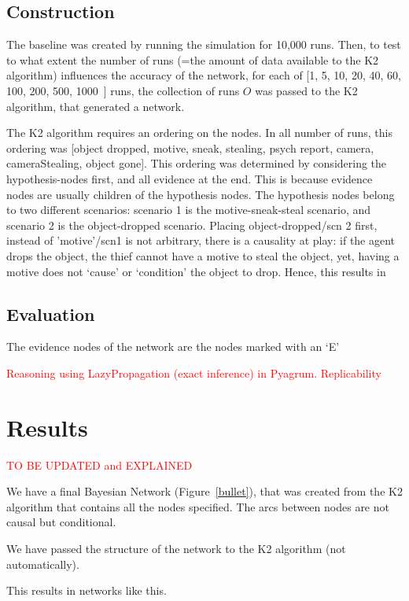 \documentclass[12pt]{article}
\begin{document}
\subsection{Construction}
The baseline was created by running the simulation for 10,000 runs. Then, to test to what extent the number of runs (=the amount of data available to the K2 algorithm) influences the accuracy of the network, for each of [1, 5, 10, 20, 40, 60, 100, 200, 500, 1000~] runs, the collection of runs $O$ was passed to the K2 algorithm, that generated a network.

The K2 algorithm requires an ordering on the nodes. In all number of runs, this ordering was 
[object dropped, motive, sneak, stealing, psych report, camera, cameraStealing, object gone]. This ordering was determined by considering the hypothesis-nodes first, and all evidence at the end. This is because evidence nodes are usually children of the hypothesis nodes. The hypothesis nodes belong to two different scenarios: scenario 1 is the motive-sneak-steal scenario, and scenario 2 is the object-dropped scenario. Placing object-dropped/scn 2 first, instead of 'motive'/scn1 is not arbitrary, there is a causality at play: if the agent drops the object, the thief cannot have a motive to steal the object, yet, having a motive does not `cause' or `condition' the object to drop. Hence, this results in 

\subsection{Evaluation}

The evidence nodes of the network are the nodes marked with an `E'

 \textcolor{red} {Reasoning using LazyPropagation (exact inference) in Pyagrum. Replicability}


\section{Results}


 \textcolor{red} {TO BE UPDATED and EXPLAINED}

We have a final Bayesian Network (Figure~\ref{bullet}), that was created from the K2 algorithm that contains all the nodes specified. The arcs between nodes are not causal but conditional. 

We have passed the structure of the network to the K2 algorithm (not automatically). 

 This results in networks like this.
 
\end{document}
